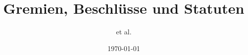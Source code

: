 



\title{Gremien, Beschl\"usse und Statuten}
\newcommand{\subtitle}{StuVe-Handbuch 1}
\date{\today}
\author{et al.}



\usepackage[utf8]{inputenc}
\usepackage[T1]{fontenc}					%
\usepackage{lmodern}						%
\renewcommand{\familydefault}{\sfdefault}
\usepackage[ngerman]{babel}					%
\usepackage{setspace}
\usepackage{tipa}							%



\setlength{\parindent}{0pt}        %
\usepackage{enumerate}


\usepackage{perpage}

\usepackage[left=2.2cm, right=2cm, top=1cm, bottom=1cm]{geometry}



\usepackage{layout}							%
\usepackage{totcount}						%

\usepackage[final]{pdfpages}
\usepackage{graphicx}


